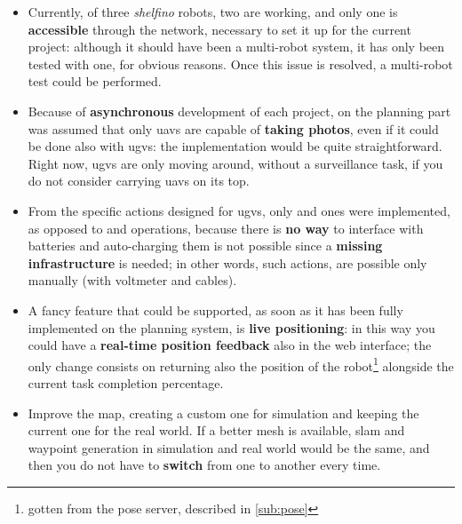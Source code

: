 \begin{itemize}

\item Currently, of three \textit{shelfino} robots, two are working, and only one is \textbf{accessible} through the network, necessary to set it up for the current project: although it should have been a multi-robot system, it has only been tested with one, for obvious reasons. Once this issue is resolved, a multi-robot test could be performed.

\item Because of \textbf{asynchronous} development of each project, on the planning part was assumed that only \acrshort{uavs} are capable of \textbf{taking photos}, even if it could be done also with \acrshort{ugvs}: the implementation would be quite straightforward. Right now, \acrshort{ugvs} are only moving around, without a surveillance task, if you do not consider carrying \acrshort{uavs} on its top.

\item From the specific actions designed for \acrshort{ugvs}, only  and  ones were implemented, as opposed to  and  operations, because there is \textbf{no way} to interface with batteries and auto-charging them is not possible since a \textbf{missing infrastructure} is needed; in other words, such actions, are possible only manually (with voltmeter and cables).

\item A fancy feature that could be supported, as soon as it has been fully implemented on the planning system, is \textbf{live positioning}: in this way you could have a \textbf{real-time position feedback} also in the web interface; the only change consists on returning also the position of the robot\footnote{gotten from the pose server, described in \autoref{sub:pose}} alongside the current task completion percentage.


\item Improve the map, creating a custom one for simulation and keeping the current one for the real world. If a better mesh is available, \acrshort{slam} and waypoint generation in simulation and real world would be the same, and then you do not have to \textbf{switch} from one to another every time.

\end{itemize}